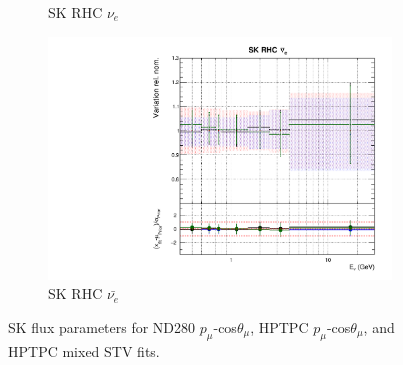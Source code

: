 \begin{figure}[t]
\begin{subfigure}{0.45\textwidth}
  \caption{SK RHC $\nu_{e}$}
\end{subfigure}
\begin{subfigure}{0.45\textwidth}
  \centering
  \includegraphics[width=0.75\linewidth]{figs/hptpcfitsflux_15}
  \caption{SK RHC $\bar{\nu_e}$}
\end{subfigure}
\caption{SK flux parameters for ND280 $p_{\mu}$-cos$\theta_{\mu}$, HPTPC $p_{\mu}$-cos$\theta_{\mu}$, and HPTPC mixed STV fits.}
\label{fig:hptpcfluxSK}
\end{figure}

